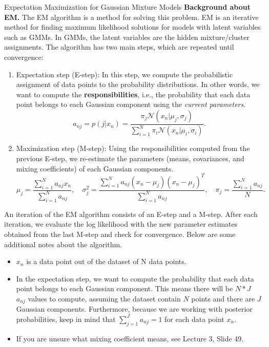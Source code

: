 \documentclass[
	english,
        solution=true
	]{tudaexercise}
\begin{document}
\begin{task}[points=6 + 4]{Expectation Maximization for Gaussian Mixture Models}
\textbf{Background about EM.}
The EM algorithm is a method for solving this problem. EM is an iterative method for finding maximum likelihood solutions for models with latent variables such as GMMs. In GMMs, the latent variables are the hidden mixture/cluster assignments. The algorithm has two main steps, which are repeated until convergence:
\begin{enumerate}
    \item Expectation step (E-step): In this step, we compute the probabilistic assignment of data points to the probability distributions. In other words, we want to compute the \textbf{responsibilities}, i.e., the probability that each data point belongs to each Gaussian component using the \textit{current parameters}.
    \begin{equation*}
    a_{nj} = p(j|x_n) = \frac{ \pi_j \mathcal{N}(x_n  | \mu_j, \sigma_j) }
                                { \sum_{i=1}^N \pi_i \mathcal{N}(x_n | \mu_i, \sigma_i) }.
    \end{equation*}
    \item Maximization step (M-step): Using the responsibilities computed from the previous E-step, we re-estimate the parameters (means, covariances, and mixing coefficients) of each Gaussian components. 
    \begin{equation*}
    \mu_j = \frac{ \sum_{i=1}^N a_{nj}x_n } { \sum_{i=1}^N a_{nj} }, \quad
    \sigma_j^2 = \frac{ \sum_{i=1}^N a_{nj}(x_n-\mu_j)(x_n-\mu_j)^T } { \sum_{i=1}^N a_{nj} },
    \quad \pi_j = \frac{ \sum_{i=1}^N a_{nj} } {N }.
    \end{equation*}
\end{enumerate}
An iteration of the EM algorithm consists of an E-step and a M-step. After each iteration, we evaluate the log likelihood with the new parameter estimates obtained from the last M-step and check for convergence. Below are some additional notes about the algorithm.
\begin{itemize}
    \item $x_n$ is a data point out of the dataset of N data points.
    \item In the expectation step, we want to compute the probability that each data point belongs to each Gaussian component. This means there will be $N*J$ $a_{nj}$ values to compute, assuming the dataset contain $N$ points and there are $J$ Gaussian components. Furthermore, because we are working with posterior probabilities, keep in mind that $ \sum_{j=1}^J a_{nj} = 1$ for each data point $x_n$.
    \item If you are unsure what mixing coefficient means, see Lecture 3, Slide 49.

\end{itemize}
\end{task}
\end{document}
